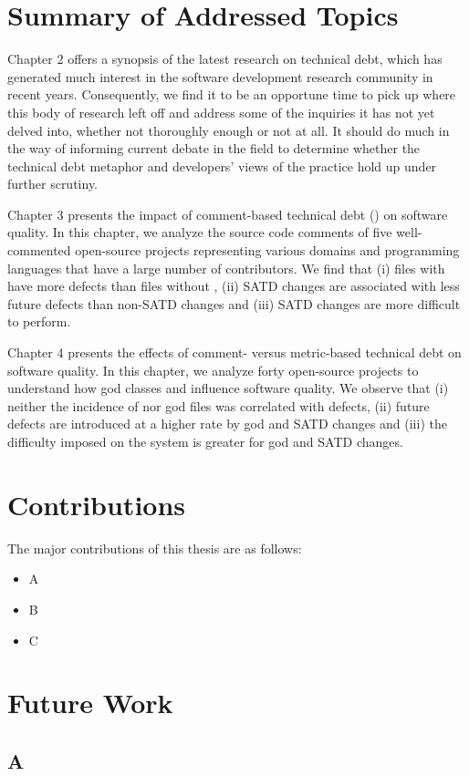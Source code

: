 
\section{Summary of Addressed Topics}


Chapter 2 offers a synopsis of the latest research on technical debt, which has generated much interest in the software development research community in recent years. Consequently, we find it to be an opportune time to pick up where this body of research left off and address some of the inquiries it has not yet delved into, whether not thoroughly enough or not at all. It should do much in the way of informing current debate in the field to determine whether the technical debt metaphor and developers' views of the practice hold up under further scrutiny.

Chapter 3 presents the impact of comment-based technical debt (\SATD) on software quality. In this chapter, we analyze the source code comments of five well-commented open-source projects representing various domains and programming languages that have a large number of contributors. We find that (i) files with \SATD have more defects than files without \SATD, (ii) SATD changes are associated with less future defects than non-SATD changes and (iii) SATD changes are more difficult to perform.

Chapter 4 presents the effects of comment- versus metric-based technical debt on software quality. In this chapter, we analyze forty open-source projects to understand how god classes and \SATD influence software quality. We observe that (i) neither the incidence of \SATD nor god files was correlated with defects, (ii) future defects are introduced at a higher rate by god and SATD changes and (iii) the difficulty imposed on the system is greater for god and SATD changes.

\section{Contributions}
The major contributions of this thesis are as follows:

\begin{itemize}
	\item A
	\item B
	\item C
\end{itemize}
\section{Future Work}

\subsection{A}